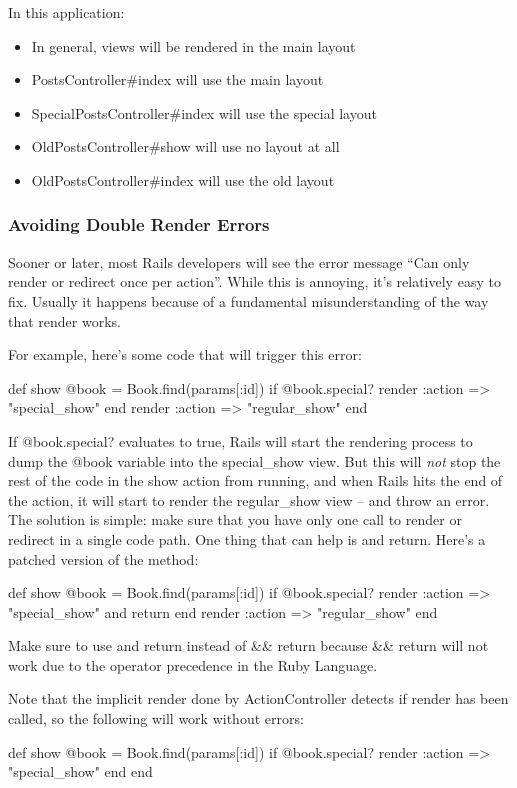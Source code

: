 \documentclass[10pt]{book}
\newenvironment{code}{%
  \scriptsize
    \verbatim
}{%
    \endverbatim
    \newline
}
\begin{document}
In this application:
\begin{itemize}
	\item In general, views will be rendered in the main layout
	\item PostsController\#index will use the main layout
	\item SpecialPostsController\#index will use the special layout
	\item OldPostsController\#show will use no layout at all
	\item OldPostsController\#index will use the old layout
\end{itemize}

\subsubsection{ Avoiding Double Render Errors}

Sooner or later, most Rails developers will see the error message  “Can only render or redirect once per action”. While this is annoying,  it’s relatively easy to fix. Usually it happens because of a fundamental  misunderstanding of the way that render works.

For example, here’s some code that will trigger this error:
\begin{code}
def show
  @book = Book.find(params[:id])
  if @book.special?
    render :action => "special_show"
  end
  render :action => "regular_show"
end
\end{code}

If @book.special? evaluates to true, Rails will start the rendering process to dump the @book variable into the special\_show view. But this will \emph{not} stop the rest of the code in the show action from running, and when Rails hits the end of the action, it will start to render the regular\_show view – and throw an error. The solution is simple: make sure that you have only one call to render or redirect in a single code path. One thing that can help is and return. Here’s a patched version of the method:
\begin{code}
def show
  @book = Book.find(params[:id])
  if @book.special?
    render :action => "special_show" and return
  end
  render :action => "regular_show"
end
\end{code}

Make sure to use and return instead of \&\& return because \&\& return will not work due to the operator precedence in the Ruby Language.

Note that the implicit render done by ActionController detects if render has been called, so the following will work without errors:
\begin{code}
def show
  @book = Book.find(params[:id])
  if @book.special?
    render :action => "special_show"
  end
end
\end{code}
\end{document}
